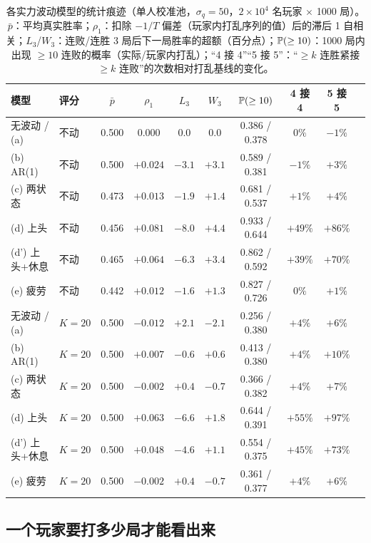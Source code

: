 \begin{table}[htbp]
\centering\small
\caption{各实力波动模型的统计痕迹（单人校准池，$\sigma_q=50$，$2\times10^4$ 名玩家 $\times$ 1000 局）。$\bar p$：平均真实胜率；$\rho_1$：扣除 $-1/T$ 偏差（玩家内打乱序列的值）后的滞后 1 自相关；$L_3$/$W_3$：连败/连胜 3 局后下一局胜率的超额（百分点）；$\mathbb{P}(\ge10)$：1000 局内出现 $\ge10$ 连败的概率（实际/玩家内打乱）；“4 接 4”“5 接 5”：“$\ge k$ 连胜紧接 $\ge k$ 连败”的次数相对打乱基线的变化。}
\label{tab:ch3-models}
\footnotesize
\setlength{\tabcolsep}{4pt}
\begin{tabular}{llcccccccc}
\toprule
模型 & 评分 & $\bar p$ & $\rho_1$ & $L_3$ & $W_3$ & $\mathbb{P}(\ge10)$ & 4 接 4 & 5 接 5 \\
\midrule
无波动 / (a) & 不动 & 0.500 & $0.000$ & $0.0$ & $0.0$ & 0.386 / 0.378 & $0\%$ & $-1\%$ \\
(b) AR(1) & 不动 & 0.500 & $+0.024$ & $-3.1$ & $+3.1$ & 0.589 / 0.381 & $-1\%$ & $+3\%$ \\
(c) 两状态 & 不动 & 0.473 & $+0.013$ & $-1.9$ & $+1.4$ & 0.681 / 0.537 & $+1\%$ & $+4\%$ \\
(d) 上头 & 不动 & 0.456 & $+0.081$ & $-8.0$ & $+4.4$ & 0.933 / 0.644 & $+49\%$ & $+86\%$ \\
(d') 上头+休息 & 不动 & 0.465 & $+0.064$ & $-6.3$ & $+3.4$ & 0.862 / 0.592 & $+39\%$ & $+70\%$ \\
(e) 疲劳 & 不动 & 0.442 & $+0.012$ & $-1.6$ & $+1.3$ & 0.827 / 0.726 & $0\%$ & $+1\%$ \\
\midrule
无波动 / (a) & $K=20$ & 0.500 & $-0.012$ & $+2.1$ & $-2.1$ & 0.256 / 0.380 & $+4\%$ & $+6\%$ \\
(b) AR(1) & $K=20$ & 0.500 & $+0.007$ & $-0.6$ & $+0.6$ & 0.413 / 0.380 & $+4\%$ & $+10\%$ \\
(c) 两状态 & $K=20$ & 0.500 & $-0.002$ & $+0.4$ & $-0.7$ & 0.366 / 0.382 & $+4\%$ & $+7\%$ \\
(d) 上头 & $K=20$ & 0.500 & $+0.063$ & $-6.6$ & $+1.8$ & 0.644 / 0.391 & $+55\%$ & $+97\%$ \\
(d') 上头+休息 & $K=20$ & 0.500 & $+0.048$ & $-4.6$ & $+1.1$ & 0.554 / 0.375 & $+45\%$ & $+73\%$ \\
(e) 疲劳 & $K=20$ & 0.500 & $-0.002$ & $+0.4$ & $-0.7$ & 0.361 / 0.377 & $+4\%$ & $+6\%$ \\
\bottomrule
\end{tabular}
\end{table}

\subsection{一个玩家要打多少局才能看出来}
\label{sec:ch3-power}

